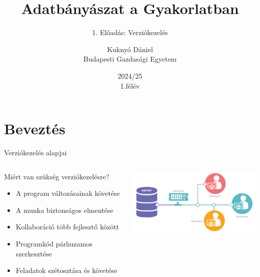 \documentclass[english, aspectratio=169]{beamer}
\makeatletter
\newcommand\makebeamertitle{\frame{\maketitle}}
\let\origtableofcontents=\tableofcontents
\def\tableofcontents{\@ifnextchar[{\origtableofcontents}{\gobbletableofcontents}}
\def\gobbletableofcontents#1{\origtableofcontents}
\makeatother
\begin{document}
\section{Beveztés}
\title[]{Adatbányászat a Gyakorlatban}
\subtitle{1. Előadás: Verziókezelés}
\author[Kuknyó Dániel]{Kuknyó Dániel\\Budapesti Gazdasági Egyetem}
\date{2024/25\\1.félév}
\makebeamertitle

\begin{frame}
\tableofcontents{}
\end{frame}

\begin{frame}
	\tableofcontents[currentsection]
\end{frame}

\begin{frame}{Verziókezelés alapjai}
\begin{columns}
\begin{column}{0.5\textwidth}
Miért van szükség verziókezelésre?
\begin{itemize}
	\item A program változásainak követése
	\item A munka biztonságos elmentése
	\item Kollaboráció több fejlesztő között
	\item Programkód párhuzamos szerkesztése
	\item Feladatok szétosztása és követése
\end{itemize}
\end{column}
\begin{column}{0.5\textwidth}
\begin{center}
\includegraphics[width=7cm, keepaspectratio]{images/version_control.png}
\end{center}
\end{column}
\end{columns}
\end{frame}
\end{document}
